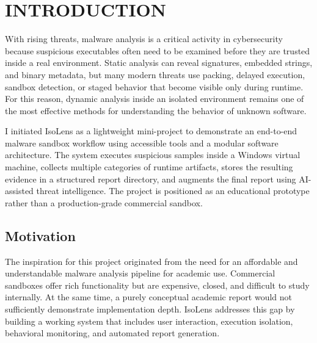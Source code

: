 \documentclass[a4paper,12pt,oneside]{report}
\newcommand{\changefont}{%
\fontsize{10}{12}\selectfont
}
\begin{document}
\newpage


\newpage
\renewcommand\thepage{\arabic{page}}
\clearpage
\setlength{\headheight}{15pt}
\pagestyle{fancy}
\fancyhf{}
\lhead{\changefont\thechapter.\leftmark}
\rhead{}
\cfoot{\thepage}
\renewcommand{\chaptermark}[1]{\markboth{#1}{}}
\renewcommand{\sectionmark}[1]{\markright{#1}{}}
\renewcommand{\headrulewidth}{0.5pt}
\setcounter{page}{1}

\chapter{INTRODUCTION}
\noindent
With rising threats, malware analysis is a critical activity in cybersecurity because suspicious executables often need to be examined before they are trusted inside a real environment. Static analysis can reveal signatures, embedded strings, and binary metadata, but many modern threats use packing, delayed execution, sandbox detection, or staged behavior that become visible only during runtime. For this reason, dynamic analysis inside an isolated environment remains one of the most effective methods for understanding the behavior of unknown software.

\par

\par

I initiated IsoLens as a lightweight mini-project to demonstrate an end-to-end malware sandbox workflow using accessible tools and a modular software architecture. The system executes suspicious samples inside a Windows virtual machine, collects multiple categories of runtime artifacts, stores the resulting evidence in a structured report directory, and augments the final report using AI-assisted threat intelligence. The project is positioned as an educational prototype rather than a production-grade commercial sandbox.

\section{Motivation}
\noindent
The inspiration for this project originated from the need for an affordable and understandable malware analysis pipeline for academic use. Commercial sandboxes offer rich functionality but are expensive, closed, and difficult to study internally. At the same time, a purely conceptual academic report would not sufficiently demonstrate implementation depth. IsoLens addresses this gap by building a working system that includes user interaction, execution isolation, behavioral monitoring, and automated report generation.
\end{document}
